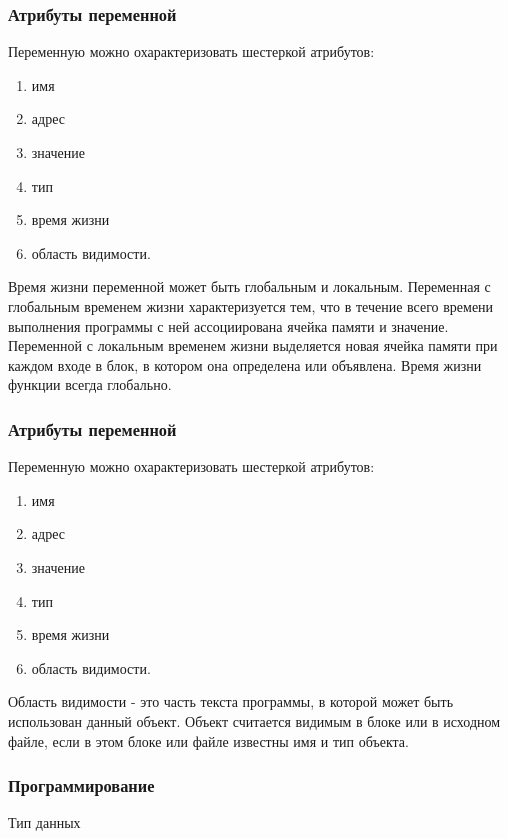 	\begin{frame}
\frametitle{Атрибуты переменной}

Переменную можно охарактеризовать шестеркой атрибутов:
\setlength{\columnsep}{0.4cm}
\begin{multicols}{2}
\begin{enumerate}
\item имя
\item адрес
\item значение
\item тип
\item время жизни
\item область видимости.
\end{enumerate}

\columnbreak
 \small
Время жизни переменной может быть глобальным и локальным. Переменная с глобальным временем жизни характеризуется тем, что в течение всего времени выполнения программы с ней ассоциирована ячейка памяти и значение. Переменной с локальным временем жизни выделяется новая ячейка памяти при каждом входе в блок, в котором она определена или объявлена. Время жизни функции всегда глобально. 

\end{multicols}

\end{frame}

	\begin{frame}
\frametitle{Атрибуты переменной}

Переменную можно охарактеризовать шестеркой атрибутов:
\setlength{\columnsep}{0.4cm}
\begin{multicols}{2}
\begin{enumerate}
\item имя
\item адрес
\item значение
\item тип
\item время жизни
\item область видимости.
\end{enumerate}

\columnbreak
 \small
Область видимости - это часть текста программы, в которой может быть использован данный объект. Объект считается видимым в блоке или в исходном файле, если в этом блоке или файле известны имя и тип объекта. 
\end{multicols}

\end{frame}

\begin{frame}
\frametitle{Программирование}

\begin{center}

\Huge
Тип данных
	
\end{center}
\end{frame}

